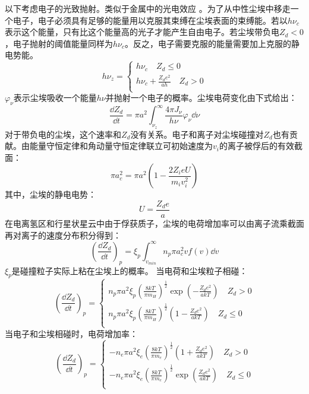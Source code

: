 以下考虑电子的光致抛射。类似于金属中的光电效应 。为了从中性尘埃中移走一个电子，电子必须具有足够的能量用以克服其束缚在尘埃表面的束缚能。若以$h\nu_{c}$表示这个能量，只有比这个能量高的光子才能产生自由电子。若尘埃带负电$Z_{d}<0$，电子抛射的阈值能量同样为$h\nu_{c}$。反之，电子需要克服的能量需要加上克服的静电势能。
\begin{equation}
		h\nu_{z}=\left\{
	\begin{aligned}
		h\nu_{c} \quad Z_{d}\leq 0\\
		h\nu_{c}+\frac{Z_{d}e^2}{ah} \quad Z_{d}>0	\\
	\end{aligned}
		\right
		.
\end{equation}
$\varphi_{\nu}$表示尘埃吸收一个能量$h\nu$并抛射一个电子的概率。尘埃电荷变化由下式给出：
\begin{equation}
	\frac{\dd Z_{d}}{\dd t}=\pi a^2\int_{\nu_{z}}^{\infty}\frac{4\pi J_{\nu}}{h\nu}\varphi_{\nu}\dd \nu
\end{equation}
对于带负电的尘埃，这个速率和$Z_{d}$没有关系。电子和离子对尘埃碰撞对$Z_{d}$也有贡献。由能量守恒定律和角动量守恒定律联立可初始速度为$v_{i}$的离子被俘后的有效截面：
\begin{equation}
	\pi a_{c}^2=\pi a^2\left(1-\frac{2Z_{i}eU}{m_{i}v_{i}^2}\right)
\end{equation}
其中，尘埃的静电电势：
\begin{equation}
	U=\frac{Z_{d}e}{a}
\end{equation}
在电离氢区和行星状星云中由于俘获质子，尘埃的电荷增加率可以由离子流乘截面再对离子的速度分布积分得到：
\begin{equation}
	\left(\frac{\dd Z_{d}}{\dd t}\right)_{p}=\xi_{p}\int_{v_{min}}^{\infty}n_{p}\pi a_{c}^2vf(v)\dd v
\end{equation}
$\xi_{p}$是碰撞粒子实际上粘在尘埃上的概率。
当电荷和尘埃粒子相碰：
\begin{equation}
	\left(\frac{\dd Z_{d}}{\dd t}\right)_{p}=\left\{
\begin{aligned}
		n_{p}\pi a^2\xi_{p}\left(\frac{8kT}{\pi m_{H}}\right)^{\frac{1}{2}}\exp(-\frac{Z_{d}e^2}{akT})\quad Z_{d}>0\\
		n_{p}\pi a^2\xi_{p}\left(\frac{8kT}{\pi m_{H}}\right)^{\frac{1}{2}}\left(1-\frac{Z_{d}e^2}{akT}\right)\quad Z_{d}\leq 0\\
\end{aligned}
	\right
	.
\end{equation}
当电子和尘埃相碰时，电荷增加率：
\begin{equation}
	\left(\frac{\dd Z_{d}}{\dd t}\right)_{p}=\left\{
	\begin{aligned}
		-n_{e}\pi a^2\xi_{e}\left(\frac{8kT}{\pi m_{e}}\right)^{\frac{1}{2}}\left(1+\frac{Z_{d}e^2}{akT}\right)\quad Z_{d}>0\\
		-n_{e}\pi a^2\xi_{e}\left(\frac{8kT}{\pi m_{e}}\right)^{\frac{1}{2}}\exp(\frac{Z_{d}e^2}{akT})\quad Z_{d}\leq 0\\
	\end{aligned}
	\right
	.
\end{equation}
